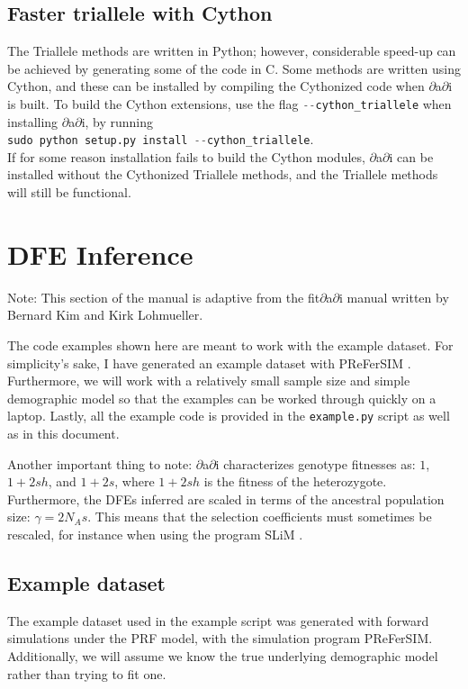 \documentclass[12pt]{article}
\makeatletter
\newcommand{\dadi}{$\partial$a$\partial$i\xspace}
\newcommand{\py}[1]{\lstinline[language=Python, showstringspaces=False]@#1@}
\makeatother
\begin{document}
\subsection{Faster triallele with Cython}
The Triallele methods are written in Python; however, considerable speed-up can be achieved by generating some of the code in C.
Some methods are written using Cython, and these can be installed by compiling the Cythonized code when \dadi is built.
To build the Cython extensions, use the flag \py{--cython_triallele} when installing \dadi, by running\\
\py{sudo python setup.py install --cython_triallele}.\\
If for some reason installation fails to build the Cython modules, \dadi can be installed without the Cythonized Triallele methods, and the Triallele methods will still be functional.


\section{DFE Inference}

Note: This section of the manual is adaptive from the fit$\partial$a$\partial$i manual written by Bernard Kim and Kirk Lohmueller.

The code examples shown here are meant to work with the example dataset. For simplicity's sake, I have generated an example dataset with PReFerSIM \cite{ortega2016}. Furthermore, we will work with a relatively small sample size and simple demographic model so that the examples can be worked through quickly on a laptop. Lastly, all the example code is provided in the \texttt{example.py} script as well as in this document.

Another important thing to note: $\partial$a$\partial$i characterizes genotype fitnesses as: $1$, $1+2sh$, and $1+2s$, where $1+2sh$ is the fitness of the heterozygote. Furthermore, the DFEs inferred are scaled in terms of the ancestral population size: $\gamma=2N_{A}s$. This means that the selection coefficients must sometimes be rescaled, for instance when using the program SLiM \cite{haller2016}.

\subsection{Example dataset}
The example dataset used in the example script was generated with forward simulations under the PRF model, with the simulation program PReFerSIM. Additionally, we will assume we know the true underlying demographic model rather than trying to fit one.
\end{document}
